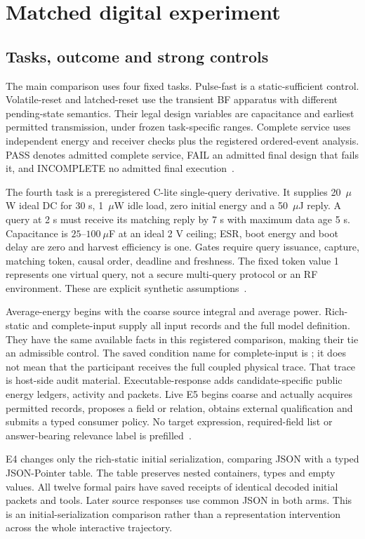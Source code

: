 \section{Matched digital experiment}
\subsection{Tasks, outcome and strong controls}
The main comparison uses four fixed tasks. Pulse-fast is a static-sufficient
control. Volatile-reset and latched-reset use the transient BF apparatus
with different pending-state semantics. Their legal design variables are
capacitance and earliest permitted transmission, under frozen task-specific
ranges. Complete service uses independent energy and receiver checks plus
the registered ordered-event analysis. PASS denotes admitted complete
service, FAIL an admitted final design that fails it, and INCOMPLETE no
admitted final execution~\cite{protocol,comparison}.

The fourth task is a preregistered C-lite single-query derivative. It supplies
20~$\mu$W ideal DC for 30 s, 1~$\mu$W idle load, zero initial energy and
a 50~$\mu$J reply. A query at 2 s must receive its matching reply by 7 s
with maximum data age 5 s. Capacitance is $25$--$100~\mu$F at an ideal
2 V ceiling; ESR, boot energy and boot delay are zero and harvest efficiency
is one. Gates require query issuance, capture, matching token, causal order,
deadline and freshness. The fixed token value 1 represents one virtual
query, not a secure multi-query protocol or an RF environment. These are
explicit synthetic assumptions~\cite{derivative}.

Average-energy begins with the coarse source integral and average power.
Rich-static and complete-input supply all input records and the full
model definition. They have the same available facts in this registered
comparison, making their tie an admissible control. The saved condition
name for complete-input is ; it does not mean that the
participant receives the full coupled physical trace. That trace is
host-side audit material. Executable-response adds candidate-specific
public energy ledgers, activity and packets. Live E5 begins coarse and
actually acquires permitted records, proposes a field or relation, obtains
external qualification and submits a typed consumer policy. No target
expression, required-field list or answer-bearing relevance label is
prefilled~\cite{protocol,tables}.

E4 changes only the rich-static initial serialization, comparing JSON with
a typed JSON-Pointer table. The table preserves nested containers, types
and empty values. All twelve formal pairs have saved receipts of identical
decoded initial packets and tools. Later source responses use common JSON
in both arms. This is an initial-serialization comparison rather than a
representation intervention across the whole interactive trajectory.

